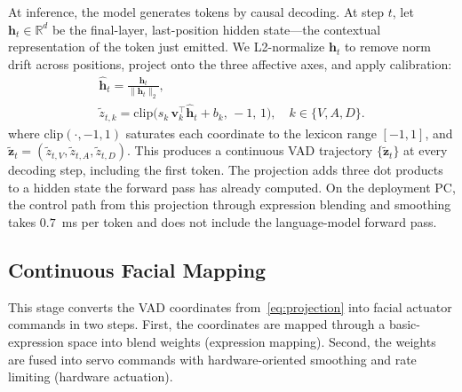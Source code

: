 \documentclass[letterpaper, 10 pt, conference]{ieeeconf/ieeeconf}
\begin{document}
At inference, the model generates tokens by causal decoding.
At step $t$, let $\mathbf{h}_t \in \mathbb{R}^{d}$ be the final-layer, last-position hidden state---the contextual representation of the token just emitted.
We L2-normalize $\mathbf{h}_t$ to remove norm drift across positions, project onto the three affective axes, and apply calibration:
\begin{equation}
\begin{gathered}
    \hat{\mathbf{h}}_t = \frac{\mathbf{h}_t}{\|\mathbf{h}_t\|_2}, \\[2pt]
    \tilde{z}_{t,k} = \mathrm{clip}\bigl(s_k\,\mathbf{v}_k^\top\hat{\mathbf{h}}_t + b_k,\,-1,\,1\bigr),
    \quad k \in \{V, A, D\}.
\end{gathered}
\label{eq:projection}
\end{equation}
where $\mathrm{clip}(\cdot,-1,1)$ saturates each coordinate to the lexicon range $[-1,1]$, and $\tilde{\mathbf{z}}_t=(\tilde{z}_{t,V},\tilde{z}_{t,A},\tilde{z}_{t,D})$. This produces a continuous VAD trajectory $\{\tilde{\mathbf{z}}_t\}$ at every decoding step, including the first token.
The projection adds three dot products to a hidden state the forward pass has already computed. On the deployment PC, the control path from this projection through expression blending and smoothing takes $0.7$~ms per token and does not include the language-model forward pass.

\subsection{Continuous Facial Mapping}
\label{sec:actuator}

This stage converts the VAD coordinates from~\eqref{eq:projection} into facial actuator commands in two steps. First, the coordinates are mapped through a basic-expression space into blend weights (expression mapping). Second, the weights are fused into servo commands with hardware-oriented smoothing and rate limiting (hardware actuation).
\end{document}
